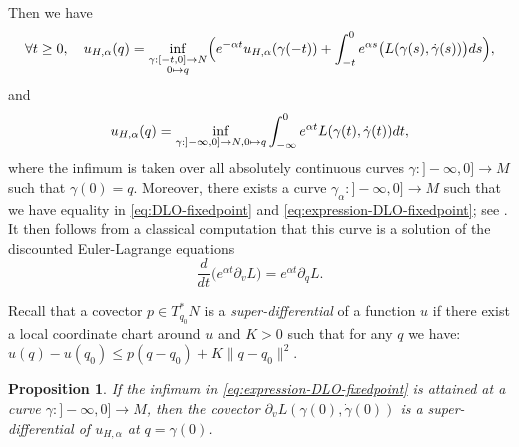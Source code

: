 \documentclass[10pt]{amsart}
\newcommand\mto{\mathchoice{\longmapsto}{\mapsto}{\mapsto}{\mapsto}}
\newtheorem{prop}[thm]{Proposition}
\theoremstyle{definition}
\begin{document}
Then we have
\begin{equation} \label{eq:DLO-fixedpoint}
\forall t\geq 0,\quad u_{H, \alpha}(q)=\inf_{\substack{\gamma:[-t, 0]\to N\\0\mto q}} \Bigl(e^{-\alpha t}u_{H, \alpha}(\gamma(-t))+\int_{-t}^0 e^{\alpha s}\bigl(L(\gamma (s), \dot \gamma (s))\bigr)ds\Bigr) ,\end{equation}
and
\begin{equation} \label{eq:expression-DLO-fixedpoint}
u_{H, \alpha}(q)=\inf_{\gamma:{}]-\infty, 0]\to N, 0\mto q} \int_{-\infty}^0 e^{\alpha t}L(\gamma (t), \dot \gamma (t))dt,
\end{equation}
where the infimum is taken over all absolutely continuous curves $\gamma:{}]-\infty, 0]\to M$ such that $\gamma(0)=q$.
Moreover, there exists a curve $\gamma_\alpha:{}]-\infty, 0]\to M$ such that we have equality in \eqref{eq:DLO-fixedpoint} and \eqref{eq:expression-DLO-fixedpoint}; see \cite[App.\,B]{DFIZ}. It then follows from a classical computation that this curve is a solution of the discounted Euler-Lagrange equations
\[
\frac{d}{dt}\bigl(e^{\alpha t}\partial_vL\bigr)=e^{\alpha t}\partial_qL.
\]

Recall that a covector $p\in T^*_{q_0}N$ is a \emph{super-differential} of a function $u$ if there exist a local coordinate chart around $u$ and $K>0$ such that for any $q$ we have: $u(q)-u(q_0)\leq p(q-q_0)+K\|q-q_0\|^2$.

\begin{prop}\label{prop:super-differential} If the infimum in \eqref{eq:expression-DLO-fixedpoint} is attained at a curve $\gamma:{}]-\infty, 0]\to M$,
then the covector $\partial_vL(\gamma(0), \dot\gamma(0))$ is
a super-differential of $u_{H, \alpha}$ at $q=\gamma(0)$.
\end{prop}
\end{document}
